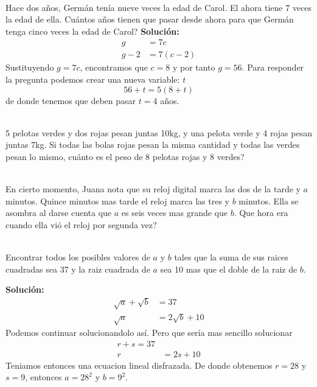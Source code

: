 \begin{ejemplo}{\ \\}
	Hace dos años, Germán tenía nueve veces la edad de Carol. El ahora tiene 7 veces la edad de ella. Cuántos años tienen que pasar desde ahora para que Germán tenga cinco veces la edad de Carol?	
	\textbf{Solución: }
	\begin{align*}
	g&= 7c\\
	g-2 &= 7(c-2)
	\end{align*}
	Sustituyendo $g=7c$, encontramos que $c=8$ y por tanto $g=56$. Para responder la pregunta podemos crear una nueva variable: $t$
	\[56+t = 5(8+t)\]
	de donde tenemos que deben pasar $t=4$ años.
\end{ejemplo}

\begin{exer}{\ \\}
	5 pelotas verdes y dos rojas pesan juntas 10kg, y una pelota verde y 4 rojas pesan juntas 7kg. Si todas las bolas rojas pesan la misma cantidad y todas las verdes pesan lo mismo, cuánto es el peso de 8 pelotas rojas y 8 verdes?
\end{exer}

\begin{exer}{\ \\}
	En cierto momento, Juana nota que su reloj digital marca las dos de la tarde y $a$ minutos. Quince minutos mas tarde el reloj marca las tres y $b$ minutos. Ella se asombra al darse cuenta que $a$ es seis veces mas grande que $b$. Que hora era cuando ella vió el reloj por segunda vez?
\end{exer}

\begin{ejemplo}{\ \\}
	Encontrar todos los posibles valores de $a$ y $b$ tales que la suma de sus raices cuadradas sea 37 y la raiz cuadrada de $a$ sea 10 mas que el doble de la raiz de $b$.
	
	\textbf{Solución: }
	\begin{align*}
	\sqrt{a} + \sqrt{b}&= 37\\
	\sqrt{a}&= 2\sqrt{b}+10
	\end{align*}
	Podemos continuar solucionandolo así. Pero que sería mas sencillo solucionar
	\begin{align*}
	r + s= 37\\
	r &= 2s+10
	\end{align*}
	Teniamos entonces una ecuacion lineal disfrazada. De donde obtenemos $r=28$ y $s=9$, entonces $a=28^2$ y $b=9^2$.
\end{ejemplo}


